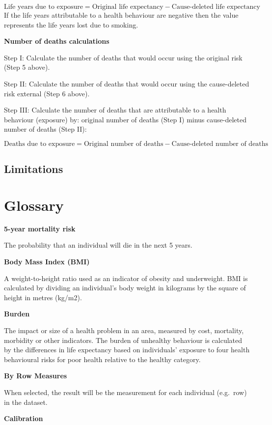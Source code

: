 \documentclass[]{book}
\begin{document}
\[ \text{Life years due to exposure} = \text{Original life expectancy} - \text{Cause-deleted life expectancy}\]
If the life years attributable to a health behaviour are negative then
the value represents the life years lost due to smoking.

\textbf{Number of deaths calculations}

Step I: Calculate the number of deaths that would occur using the
original risk (Step 5 above).

Step II: Calculate the number of deaths that would occur using the
cause-deleted risk external (Step 6 above).

Step III: Calculate the number of deaths that are attributable to a
health behaviour (exposure) by: original number of deaths (Step I) minus
cause-deleted number of deaths (Step II):

\[\text{Deaths due to exposure} = \text{Original number of deaths} - \text{Cause-deleted number of deaths}\]

\section{Limitations}\label{limitations}

\chapter{Glossary}\label{glossary}

\textbf{5-year mortality risk}

The probability that an individual will die in the next 5 years.

\textbf{Body Mass Index (BMI)}

A weight-to-height ratio used as an indicator of obesity and
underweight. BMI is calculated by dividing an individual's body weight
in kilograms by the square of height in metres (kg/m2).

\textbf{Burden}

The impact or size of a health problem in an area, measured by cost,
mortality, morbidity or other indicators. The burden of unhealthy
behaviour is calculated by the differences in life expectancy based on
individuals' exposure to four health behavioural risks for poor health
relative to the healthy category.

\textbf{By Row Measures}

When selected, the result will be the measurement for
each individual (e.g.~row) in the dataset.

\textbf{Calibration}
\end{document}
